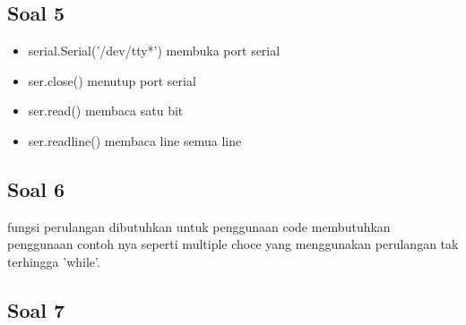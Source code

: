 \subsection{Soal 5}
\begin{itemize}
	\item serial.Serial('/dev/tty*')
	membuka port serial
	
	\item ser.close()
	menutup port serial
	
	\item ser.read()
	membaca satu bit
	
	\item ser.readline()
	membaca line semua line
		
\end{itemize}

\subsection{Soal 6}
fungsi perulangan dibutuhkan untuk penggunaan code membutuhkan penggunaan contoh nya seperti multiple choce yang menggunakan perulangan tak terhingga 'while'.

\subsection{Soal 7}



